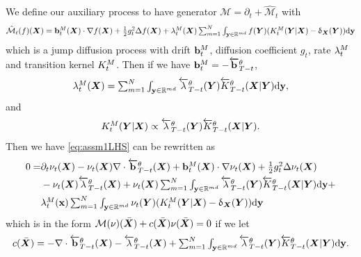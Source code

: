 We define our auxiliary process to have generator $\mathcal{M} = \partial_t + \hat{\mathcal{M}}_t$ with
\begin{equation}
  \textstyle 
    \hat{\mathcal{M}}_t(f)({\bm{X}}) = \mathbf{b}^M_t ({\bm{X}}) \cdot \nabla f({\bm{X}}) + \frac{1}{2} g_{t}^2 \Delta f ({\bm{X}}) + \lambda^M_t({\bm{X}}) \sum_{m=1}^N \int_{\mathbf{y} \in \mathbb{R}^{md}} f({\bm{Y}}) ( K^{M}_t({\bm{Y}} | {\bm{X}}) - \updelta_{{\bm{X}}}({\bm{Y}}) ) \mathrm{d} \mathbf{y}
\end{equation}
which is a jump diffusion process with drift $\mathbf{b}^M_t$, diffusion coefficient $g_{t}$, rate $\lambda^M_t$ and transition kernel $K^{M}_t$. Then if we have $\mathbf{b}^M_t = - \overleftarrow{\mathbf{b}}_{T-t}^\theta$,
\begin{equation}
  \label{eq:def_mrate}
  \textstyle 
    \lambda^M_t({\bm{X}}) = \sum_{m=1}^N \int_{\mathbf{y} \in \mathbb{R}^{md}} \overleftarrow{\lambda}_{T-t}^\theta({\bm{Y}}) \overleftarrow{K}_{T-t}^\theta({\bm{X}} | {\bm{Y}}) \mathrm{d} \mathbf{y} , 
\end{equation}
and
\begin{equation}
  \label{eq:def_mtkt}
  \textstyle 
    K^{M}_t ({\bm{Y}} | {\bm{X}}) \propto \overleftarrow{\lambda}_{T-t}^\theta({\bm{Y}}) \overleftarrow{K}_{T-t}^\theta({\bm{X}} | {\bm{Y}}) . 
\end{equation}
Then we have \eqref{eq:assm1LHS} can be rewritten as 
\begin{align}
    0 = &\textstyle \partial_t \nu_t({\bm{X}}) - \nu_t({\bm{X}}) \nabla \cdot \overleftarrow{\mathbf{b}}_{T-t}^\theta({\bm{X}}) + \mathbf{b}^M_t({\bm{X}}) \cdot \nabla \nu_t({\bm{X}}) + \frac{1}{2} g_{t}^2 \Delta \nu_t({\bm{X}})\\
    &\textstyle - \nu_t({\bm{X}}) \overleftarrow{\lambda}_{T-t}^\theta({\bm{X}}) + \nu_t({\bm{X}}) \sum_{m=1}^N \int_{\mathbf{y} \in \mathbb{R}^{md}} \overleftarrow{\lambda}_{T-t}^\theta({\bm{Y}}) \overleftarrow{K}_{T-t}^\theta({\bm{X}} | {\bm{Y}}) \mathrm{d} \mathbf{y} + \\
    &\textstyle  \lambda^M_t({\mathbf{x}}) \sum_{m=1}^N \int_{\mathbf{y} \in \mathbb{R}^{md}} \nu_t({\bm{Y}}) ( K^{M}_t({\bm{Y}} | {\bm{X}}) - \updelta_{{\bm{X}}}({\bm{Y}}) )\mathrm{d} \mathbf{y}
\end{align}
which is in the form $\mathcal{M}(\nu)(\bar{{\bm{X}}}) + c(\bar{{\bm{X}}}) \nu(\bar{{\bm{X}}}) = 0$ if we let
\begin{equation}
  \textstyle 
    c(\bar{{\bm{X}}}) = -\nabla \cdot \overleftarrow{\mathbf{b}}_{T-t}^\theta({\bm{X}}) - \overleftarrow{\lambda}_{T-t}^\theta({\bm{X}}) + \sum_{m=1}^N \int_{\mathbf{y} \in \mathbb{R}^{md}} \overleftarrow{\lambda}_{T-t}^\theta({\bm{Y}}) \overleftarrow{K}_{T-t}^\theta({\bm{X}} | {\bm{Y}}) \mathrm{d} \mathbf{y} . 
\end{equation}


